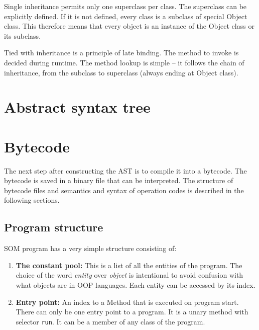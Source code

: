 \documentclass[thesis=M,english]{FITthesis}[2019/12/23]
\begin{document}
Single inheritance permits only one superclass per class. The superclass can be explicitly defined. If it is not defined,
every class is a subclass of special Object class. This therefore means that every object is an instance of the Object class
or its subclass.

Tied with inheritance is a principle of late binding. The method to invoke is decided during runtime. The method lookup is simple
-- it follows the chain of inheritance, from the subclass to superclass (always ending at Object class). 

\section{Abstract syntax tree}

\section{Bytecode}
The next step after constructing the AST is to compile it into a bytecode. The bytecode is saved in a binary file that can be
interpreted. The structure of bytecode files and semantics and syntax of operation codes is described in the following sections.

\subsection{Program structure}
SOM program has a very simple structure consisting of:
\begin{enumerate}
	\item \textbf{The constant pool:} This is a list of all the entities of the program. The choice of the word \textit{entity}
		over \textit{object} is intentional to avoid confusion with what objects are in OOP languages. Each entity can be accessed
		by its index.
	\item \textbf{Entry point: } An index to a Method that is executed on program start. There can only be one entry point to a
		program. It is a unary method with selector \texttt{run}. It can be a member of any class of the program.  
\end{enumerate}
\end{document}

